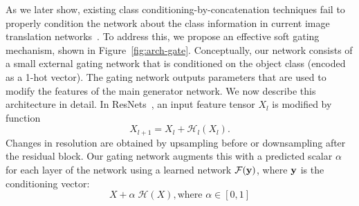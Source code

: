As we later show, existing class conditioning-by-concatenation techniques fail to properly condition the network about the class information in current image translation networks~\cite{isola2016image2image,zhu2017toward}.
%
To address this, we propose an effective soft gating mechanism, shown in Figure~\ref{fig:arch-gate}.
Conceptually, our network consists of a small external gating network that is conditioned on the object class (encoded as a 1-hot vector).
The gating network outputs parameters that are used to modify the features of the main generator network.
We now describe this architecture in detail.
%
In ResNets~\cite{he2016deep}, an input feature tensor $X_l$ is modified by function
\begin{equation}
X_{l+1} = X_l+\mathcal{H}_l(X_l).
\end{equation}
Changes in resolution are obtained by upsampling before or downsampling after the residual block.
Our gating network augments this with a predicted scalar $\alpha$ for each layer of the network using a learned network $\mathcal{F}({\bf y})$, where  ${\bf y}$ is the conditioning vector:
\begin{equation}
X + \alpha \; \mathcal{H}(X), \text{where } \alpha \in [0,1]
\end{equation}


